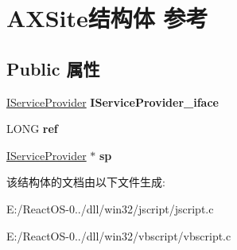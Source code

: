 \hypertarget{struct_a_x_site}{}\section{A\+X\+Site结构体 参考}
\label{struct_a_x_site}
\subsection*{Public 属性}
\begin{DoxyCompactItemize}
\item 
\mbox{\label{struct_a_x_site_a8bfeb2909c80fbbff5d5a0e9d20105c8}} 
\hyperlink{interface_i_service_provider}{I\+Service\+Provider} {\bfseries I\+Service\+Provider\+\_\+iface}
\item 
\mbox{\label{struct_a_x_site_a2f0c93f4a07b49f96ae4603a6ef86d86}} 
L\+O\+NG {\bfseries ref}
\item 
\mbox{\label{struct_a_x_site_acfac5c38451867d7b34be716ffa431da}} 
\hyperlink{interface_i_service_provider}{I\+Service\+Provider} $\ast$ {\bfseries sp}
\end{DoxyCompactItemize}


该结构体的文档由以下文件生成\+:\begin{DoxyCompactItemize}
\item 
E\+:/\+React\+O\+S-\/0../dll/win32/jscript/jscript.\+c\item 
E\+:/\+React\+O\+S-\/0../dll/win32/vbscript/vbscript.\+c\end{DoxyCompactItemize}
